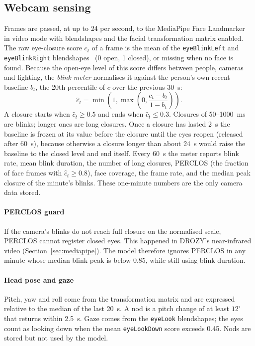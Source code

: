\subsection{Webcam sensing}
Frames are passed, at up to 24 per second, to the MediaPipe Face Landmarker~\cite{kartynnik2019real,lugaresi2019mediapipe} in video mode with blendshapes and the facial transformation matrix enabled. The raw eye-closure score $c_t$ of a frame is the mean of the \texttt{eyeBlinkLeft} and \texttt{eyeBlinkRight} blendshapes~\cite{grishchenko2023blendshapes} (0 open, 1 closed), or missing when no face is found. Because the open-eye level of this score differs between people, cameras and lighting, the \emph{blink meter} normalises it against the person's own recent baseline $b_t$, the 20th percentile of $c$ over the previous 30~s:
\begin{equation}
  \hat c_t = \min\!\left(1, \max\!\left(0, \frac{c_t - b_t}{1 - b_t}\right)\right).
  \label{eq:closure}
\end{equation}
A closure starts when $\hat c_t \geq 0.5$ and ends when $\hat c_t \leq 0.3$. Closures of 50--1000~ms are blinks; longer ones are long closures. Once a closure has lasted 2~s the baseline is frozen at its value before the closure until the eyes reopen (released after 60~s), because otherwise a closure longer than about 24~s would raise the baseline to the closed level and end itself. Every 60~s the meter reports blink rate, mean blink duration, the number of long closures, PERCLOS (the fraction of face frames with $\hat c_t \geq 0.8$), face coverage, the frame rate, and the median peak closure of the minute's blinks. These one-minute numbers are the only camera data stored.

\paragraph*{PERCLOS guard} If the camera's blinks do not reach full closure on the normalised scale, PERCLOS cannot register closed eyes. This happened in DROZY's near-infrared video (Section~\ref{sec:mediapipe}). The model therefore ignores PERCLOS in any minute whose median blink peak is below 0.85, while still using blink duration.

\paragraph*{Head pose and gaze} Pitch, yaw and roll come from the transformation matrix and are expressed relative to the median of the last 20~s. A nod is a pitch change of at least $12^\circ$ that returns within 2.5~s. Gaze comes from the \texttt{eyeLook} blendshapes; the eyes count as looking down when the mean \texttt{eyeLookDown} score exceeds 0.45. Nods are stored but not used by the model.

